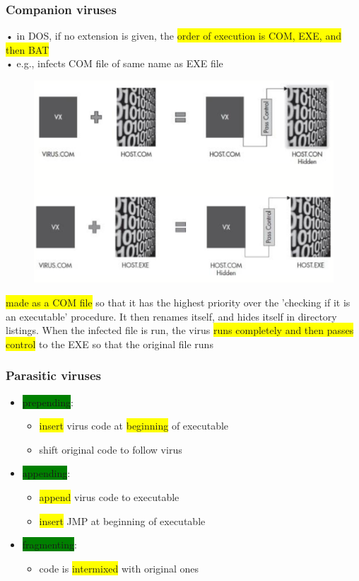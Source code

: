 \documentclass[]{project_plan}
\begin{document}
\subsubsection{Companion viruses}
• in DOS, if no extension is given, the \colorbox{yellow}{order of
  execution is COM, EXE, and then BAT}\\
• e.g., infects COM file of same name as EXE file

\begin{figure}[H]
  \centering
  \includegraphics*[width=.7\linewidth]{companion_viruses.png}
\end{figure}

\colorbox{yellow}{made as a COM file} so that it has the highest priority over the
'checking if it is an executable' procedure. It then renames itself,
and hides itself in directory listings. When the infected file is run, the
virus \colorbox{yellow}{runs completely and then passes control} to the EXE so that the original file
runs

\subsubsection{Parasitic viruses}
\begin{itemize}
  \item \colorbox{green}{prepending}:
        \begin{itemize}
          \item \colorbox{yellow}{insert} virus code at \colorbox{yellow}{beginning} of executable
          \item shift original code to follow virus
        \end{itemize}
  \item \colorbox{green}{appending}:
        \begin{itemize}
          \item \colorbox{yellow}{append} virus code to executable
          \item \colorbox{yellow}{insert} JMP at beginning of executable
        \end{itemize}
  \item \colorbox{green}{fragmenting}:
        \begin{itemize}
          \item code is \colorbox{yellow}{intermixed} with original ones
        \end{itemize}
\end{itemize}
\end{document}
